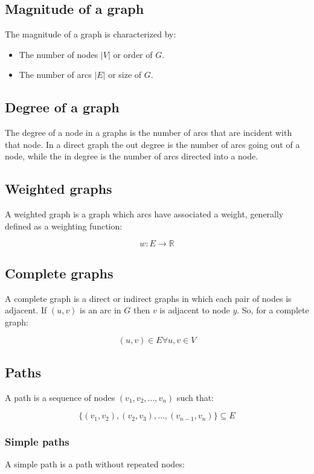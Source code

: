 	\subsection{Magnitude of a graph}
	The magnitude of a graph is characterized by:

	\begin{multicols}{2}
		\begin{itemize}
			\item The number of nodes $|V|$ or order of $G$.
			\item The number of arcs $|E|$ or size of $G$.
		\end{itemize}
	\end{multicols}

	\subsection{Degree of a graph}
	The degree of a node in a graphs is the number of arcs that are incident with that node.
	In a direct graph the out degree is the number of arcs going out of a node, while the in degree is the number of arcs directed into a node.

	\subsection{Weighted graphs}
	A weighted graph is a graph which arcs have associated a weight, generally defined as a weighting function:

	$$w:E\rightarrow\mathbb{R}$$

	\subsection{Complete graphs}
	A complete graph is a direct or indirect graphs in which each pair of nodes is adjacent.
	If $(u,v)$ is an arc in $G$ then $v$ is adjacent to node $y$.
	So, for a complete graph:

	$$(u,v)\in E\forall u,v\in V$$

	\subsection{Paths}
	A path is a sequence of nodes $(v_1,v_2,\dots,v_n)$ such that:

	$$\{(v_1,v_2), (v_2, v_3), \dots, (v_{n-1}, v_n)\}\subseteq E$$

		\subsubsection{Simple paths}
		A simple path is a path without repeated nodes:

